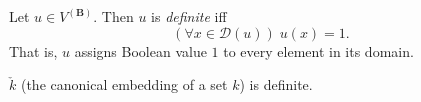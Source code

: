 Let $u \in V^{(\mathbf{B})}$. Then $u$ is \emph{definite} iff
$$(\forall x \in \mathcal{D}(u))\; u(x) = 1.$$
That is, $u$ assigns Boolean value $1$ to every element in its domain.

 $\check{k}$ (the canonical embedding of a set $k$) is definite.
